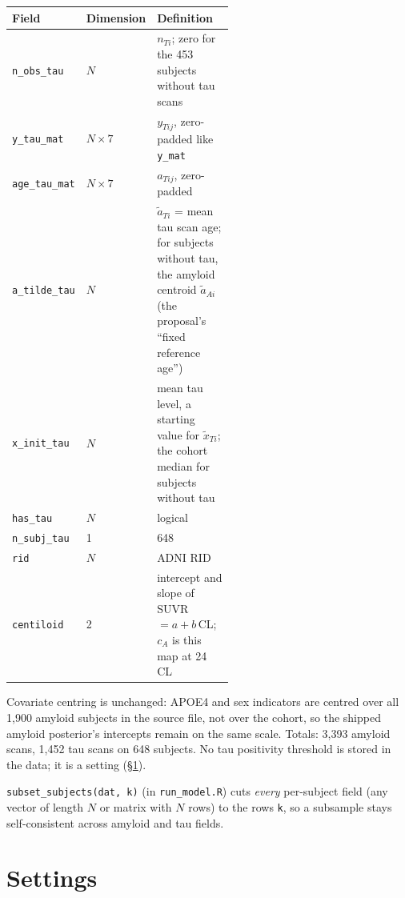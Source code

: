 \documentclass[11pt]{article}
\newcommand{\code}[1]{\texttt{#1}}
\begin{document}
\begin{center}
\begin{tabular}{@{}llp{0.55\linewidth}@{}}
\toprule
Field & Dimension & Definition \\
\midrule
\code{n\_obs\_tau} & $N$ & $n_{Ti}$; zero for the 453 subjects without tau scans \\
\code{y\_tau\_mat} & $N\times 7$ & $y_{Tij}$, zero-padded like \code{y\_mat} \\
\code{age\_tau\_mat} & $N\times 7$ & $a_{Tij}$, zero-padded \\
\code{a\_tilde\_tau} & $N$ & $\tilde a_{Ti}$ = mean tau scan age; for subjects without tau, the amyloid centroid $\tilde a_{Ai}$ (the proposal's ``fixed reference age'') \\
\code{x\_init\_tau} & $N$ & mean tau level, a starting value for $\tilde x_{Ti}$; the cohort median for subjects without tau \\
\code{has\_tau} & $N$ & logical \\
\code{n\_subj\_tau} & 1 & 648 \\
\code{rid} & $N$ & ADNI RID \\
\code{centiloid} & 2 & intercept and slope of SUVR $= a + b\,$CL; $c_A$ is this map at 24 CL \\
\bottomrule
\end{tabular}
\end{center}

Covariate centring is unchanged: APOE4 and sex indicators are centred over all
1{,}900 amyloid subjects in the source file, not over the cohort, so the shipped
amyloid posterior's intercepts remain on the same scale. Totals: 3{,}393 amyloid
scans, 1{,}452 tau scans on 648 subjects. No tau positivity threshold is stored in
the data; it is a setting (\S\ref{sec:settings}).

\code{subset\_subjects(dat, k)} (in \code{run\_model.R}) cuts \emph{every}
per-subject field (any vector of length $N$ or matrix with $N$ rows) to the rows
\code{k}, so a subsample stays self-consistent across amyloid and tau fields.

\section{Settings}\label{sec:settings}
\end{document}
